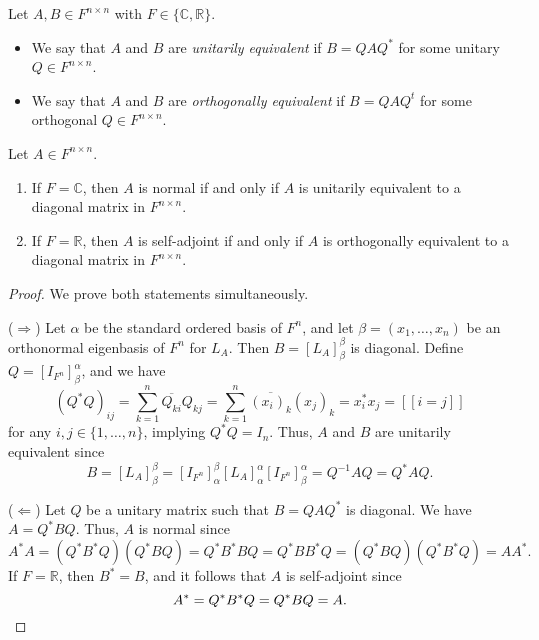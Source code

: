 \begin{definition}
  Let $A, B \in F^{n \times n}$ with $F \in \{\mathbb{C}, \mathbb{R}\}$.
  \begin{itemize}
    \item We say that $A$ and $B$ are \emph{unitarily equivalent} if
    $B = QAQ^*$ for some unitary $Q \in F^{n \times n}$.
    \item We say that $A$ and $B$ are \emph{orthogonally equivalent} if
    $B = QAQ^t$ for some orthogonal $Q \in F^{n \times n}$.
  \end{itemize}
\end{definition}

\begin{theorem}
  Let $A \in F^{n \times n}$.
  \begin{enumerate}
    \item If $F = \mathbb{C}$, then $A$ is normal if and only if $A$ is
    unitarily equivalent to a diagonal matrix in $F^{n \times n}$.
    \item If $F = \mathbb{R}$, then $A$ is self-adjoint if and only if $A$ is
    orthogonally equivalent to a diagonal matrix in $F^{n \times n}$.
  \end{enumerate}
\end{theorem}
\begin{proof}
  We prove both statements simultaneously.

  ($\Rightarrow$)
  Let $\alpha$ be the standard ordered basis of $F^n$, and let
  $\beta = (x_1, \dots, x_n)$ be an orthonormal eigenbasis of $F^n$ for $L_A$.
  Then $B = [L_A]_\beta^\beta$ is diagonal.
  Define $Q = [I_{F^n}]_\beta^\alpha$, and we have
  \begin{equation*}
    (Q^*Q)_{ij}
    = \sum_{k=1}^n \overline{Q_{ki}}Q_{kj}
    = \sum_{k=1}^n \overline{(x_i)_k}{(x_j)_k}
    = x_i^*x_j
    = [\![i = j]\!]
  \end{equation*}
  for any $i, j \in \{1, \dots, n\}$, implying $Q^*Q = I_n$.
  Thus, $A$ and $B$ are unitarily equivalent since
  \begin{equation*}
    B
    = [L_A]_\beta^\beta
    = [I_{F^n}]_\alpha^\beta[L_A]_\alpha^\alpha[I_{F^n}]_\beta^\alpha
    = Q^{-1}AQ
    = Q^*AQ.
  \end{equation*}

  ($\Leftarrow$)
  Let $Q$ be a unitary matrix such that $B = QAQ^*$ is diagonal.
  We have $A = Q^*BQ$.
  Thus, $A$ is normal since
  \begin{equation*}
    A^*A
    = (Q^*B^*Q)(Q^*BQ)
    = Q^*B^*BQ
    = Q^*BB^*Q
    = (Q^*BQ)(Q^*B^*Q)
    = AA^*.
  \end{equation*}
  If $F = \mathbb{R}$, then $B^* = B$, and it follows that $A$ is self-adjoint
  since
  \begin{equation*}
    A^*
    = Q^*B^*Q
    = Q^*BQ
    = A.
    \qedhere
  \end{equation*}
\end{proof}

